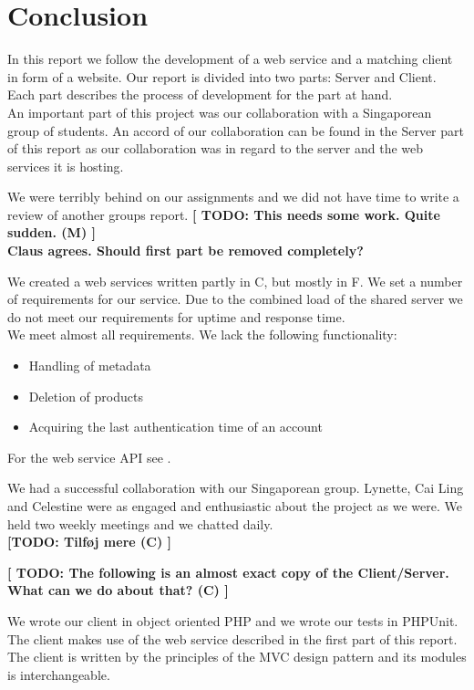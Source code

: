 \section{Conclusion}
In this report we follow the development of a web service and a matching client in form of a website. Our report is divided into two parts: Server and Client. Each part describes the process of development for the part at hand.
\\An important part of this project was our collaboration with a Singaporean group of students. An accord of our collaboration can be found in the Server part of this report as our collaboration was in regard to the server and the web services it is hosting.

We were terribly behind on our assignments and we did not have time to write a review of another groups report. \textbf{[ TODO: This needs some work. Quite sudden. (M) ]}
\\\textbf{Claus agrees. Should first part be removed completely?}

We created a web services written partly in C\Sh, but mostly in F\Sh. We set a number of requirements for our service. Due to the combined load of the shared server we do not meet our requirements for uptime and response time.
\\We meet almost all requirements. We lack the following functionality:
\begin{itemize}
\item Handling of metadata
\item Deletion of products
\item Acquiring the last authentication time of an account
\end{itemize}
\mbox{}For the web service API see .

We had a successful collaboration with our Singaporean group. Lynette, Cai Ling and Celestine were as engaged and enthusiastic about the project as we were. We held two weekly meetings and we chatted daily.
\\\textbf{ [TODO: Tilføj mere (C) ]}

\textbf{[ TODO: The following is an almost exact copy of the Client/Server. What can we do about that? (C) ]}

We wrote our client in object oriented PHP and we wrote our tests in PHPUnit. The client makes use of the web service described in the first part of this report. The client is written by the principles of the MVC design pattern and its modules is interchangeable.

